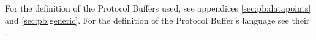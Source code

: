 \appendix
\appendixpage
\addappheadtotoc

\label{sec:fmt:datapoints}
For the definition of the Protocol Buffers used, see appendices
\ref{sec:pb:datapoints} and \ref{sec:pb:generic}. For the definition of the
Protocol Buffer's language see their
.



\label{sec:pb:datapoints}


\label{sec:pb:generic}


\label{sec:pb:datapoints}

